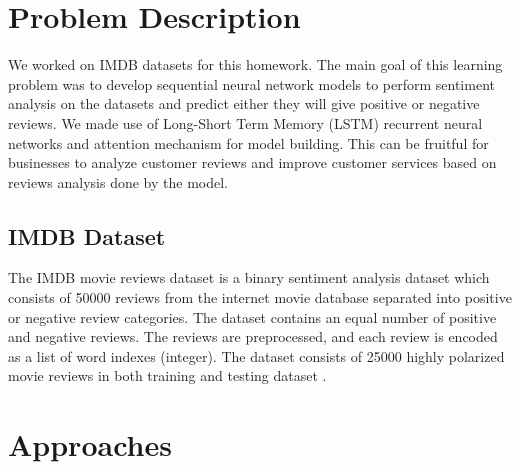 \documentclass{article}
\begin{document}
\section{Problem Description}

 We worked on IMDB datasets for this homework. The main goal of this learning problem was to develop sequential neural network models to perform sentiment analysis on the datasets and predict either they will give positive or negative reviews. We made use of Long-Short Term Memory (LSTM) recurrent neural networks and attention mechanism for model building. This can be fruitful for businesses to analyze customer reviews and improve customer services based on reviews analysis done by the model.

\subsection{IMDB Dataset}
 The IMDB movie reviews dataset is a binary sentiment analysis dataset which consists of 50000 reviews from the internet movie database separated into positive or negative review categories. The dataset contains an equal number of positive and negative reviews. The reviews are preprocessed, and each review is encoded as a list of word indexes (integer). The dataset consists of 25000 highly polarized movie reviews in both training and testing dataset \cite{TFData}.

\section{Approaches}
\end{document}
